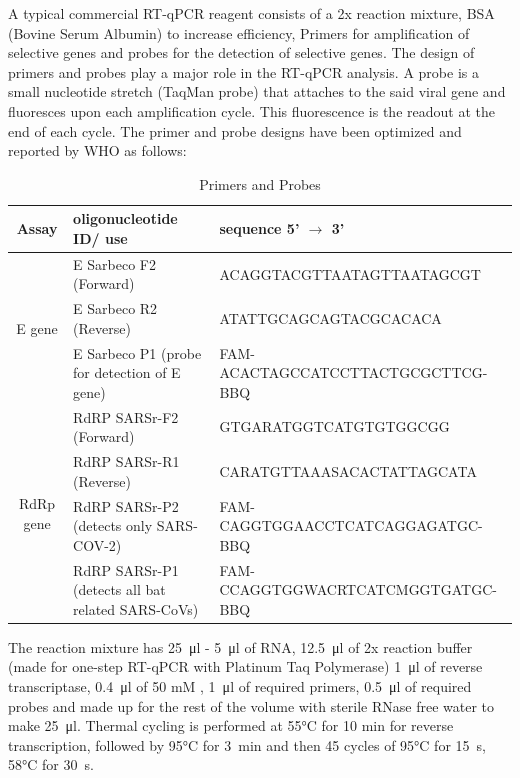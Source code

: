 \documentclass[fleqn,10pt]{wlscirep}
\begin{document}
A typical commercial RT-qPCR reagent consists of a 2x reaction mixture, BSA (Bovine Serum Albumin) to increase efficiency, Primers for amplification of selective genes and probes for the detection of selective genes. The design of primers and probes play a major role in the RT-qPCR analysis. A probe is a small nucleotide stretch (TaqMan probe) that attaches to the said viral gene and fluoresces upon each amplification cycle. This fluorescence is the readout at the end of each cycle. The primer and probe designs have been optimized and reported by WHO as follows:
\begin{table}
\begin{center}
	\begin{tabular}{ |c|l|l| } 
		\hline
		Assay & oligonucleotide ID/ use & sequence 5’ $\rightarrow$ 3’ \\ 
		\hline
		 \multirow{3}{*}{E gene} & E Sarbeco F2 (Forward) & ACAGGTACGTTAATAGTTAATAGCGT \\  \cline{2-3}
		  & E Sarbeco R2 (Reverse) & ATATTGCAGCAGTACGCACACA \\ \cline{2-3}
		 & E Sarbeco P1 (probe for detection of E gene) & FAM-ACACTAGCCATCCTTACTGCGCTTCG-BBQ \\ \cline{2-3}
		\hline
		 \multirow{4}{*}{RdRp gene} & RdRP SARSr-F2 (Forward) & GTGARATGGTCATGTGTGGCGG \\  \cline{2-3}
		& RdRP SARSr-R1 (Reverse) & CARATGTTAAASACACTATTAGCATA \\ \cline{2-3}
		& RdRP SARSr-P2 (detects only SARS-COV-2) & FAM-CAGGTGGAACCTCATCAGGAGATGC-BBQ \\ \cline{2-3}
		& RdRP SARSr-P1 (detects all bat related SARS-CoVs) & FAM-CCAGGTGGWACRTCATCMGGTGATGC-BBQ \\
		\cline{1-3}
		


	\end{tabular}
  	\caption{Primers and Probes}
	\label{tab:primes}
\end{center}
\end{table}

The reaction mixture has \SI{25}{\micro\litre} - \SI{5}{\micro\litre} of RNA, \SI{12.5}{\micro\litre} of 2x reaction buffer (made for one-step RT-qPCR with Platinum Taq Polymerase) \SI{1}{\micro\litre} of reverse transcriptase, \SI{0.4}{\micro\litre} of 50 mM , \SI{1}{\micro\litre} of required primers, \SI{0.5}{\micro\litre} of required probes and made up for the rest of the volume with sterile RNase free water to make \SI{25}{\micro\litre}. Thermal cycling is performed at 55°C for 10 min for reverse transcription, followed by 95°C for \SI{3}{\minute} and then 45 cycles of 95°C for \SI{15}{\second}, 58°C for \SI{30}{\second}.
\end{document}
